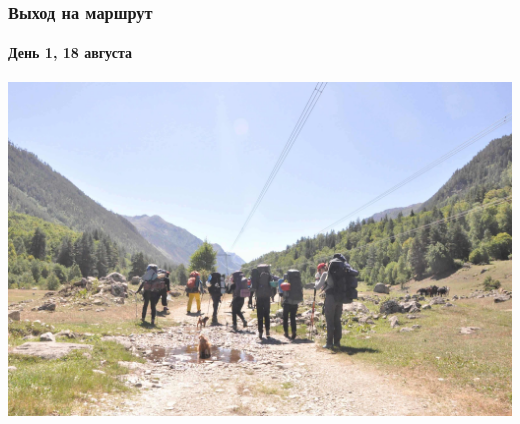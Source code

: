 \begin{frame}
	\frametitle{Выход на маршрут}
	\framesubtitle{День 1, 18 августа}
	\centering
	\includegraphics[width=\linewidth]{../pics/DSC_0412}
\end{frame}

